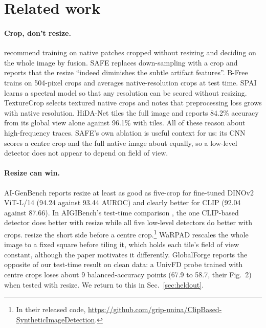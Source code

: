 \documentclass[letterpaper]{article} %
\begin{document}
\section{Related work}
\label{sec:related}

\paragraph{Crop, don't resize.} \citet{corvi2023detection} recommend
training on native patches cropped without resizing and deciding on the whole
image by fusion. SAFE \cite{li2025safe} replaces
down-sampling with a crop and reports that the resize ``indeed diminishes the
subtle artifact features''. B-Free \cite{guillaro2025bfree} trains on
504-pixel crops and averages native-resolution crops at test time.
SPAI \cite{karageorgiou2025spai} learns a spectral model so that any
resolution can be scored without resizing. TextureCrop \cite{konstantinidou2025texturecrop}
selects textured native crops and notes that preprocessing loss grows with
native resolution. HiDA-Net \cite{mu2026hidanet} tiles the full image and
reports 84.2\% accuracy from its global view alone against 96.1\% with tiles.
All of these reason about high-frequency traces. SAFE's own ablation is
useful context for us: its CNN scores a centre crop and the full native image
about equally, so a low-level detector does not appear to depend on field of
view.

\paragraph{Resize can win.} AI-GenBench \cite{pellegrini2025aigenbench}
reports resize at least as good as five-crop for fine-tuned DINOv2 ViT-L/14
(94.24 against 93.44 AUROC) and clearly better for CLIP (92.04 against 87.66).
In AIGIBench's test-time comparison \cite{li2025aigibench}, the one CLIP-based
detector does better with resize while all five low-level detectors do better
with crops. \citet{cozzolino2024raising} resize the short side
before a centre crop.\footnote{In their released code,
\url{https://github.com/grip-unina/ClipBased-SyntheticImageDetection}.} WaRPAD \cite{choi2025warpad} rescales the whole image to
a fixed square before tiling it, which holds each tile's field of view
constant, although the paper motivates it differently. GlobalForge \cite{cui2026globalforge}
reports the opposite of our test-time result on clean data: a UnivFD probe
trained with centre crops loses about 9 balanced-accuracy points (67.9 to
58.7, their Fig.~2) when tested with resize. We return to this in Sec.~\ref{sec:heldout}.
\end{document}
